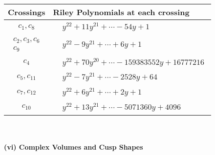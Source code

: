 \documentclass[1p]{elsarticle_modified}
\theoremstyle{definition}
\begin{document}
\begin{tabular}{m{50pt}|m{274pt}}
Crossings & \hspace{64pt}Riley Polynomials at each crossing \\
\hline $$\begin{aligned}c_{1},c_{8}\end{aligned}$$&$\begin{aligned}
&y^{22}+11 y^{21}+\cdots-54 y+1
\end{aligned}$\\
\hline $$\begin{aligned}c_{2},c_{3},c_{6}\\c_{9}\end{aligned}$$&$\begin{aligned}
&y^{22}-9 y^{21}+\cdots+6 y+1
\end{aligned}$\\
\hline $$\begin{aligned}c_{4}\end{aligned}$$&$\begin{aligned}
&y^{22}+70 y^{20}+\cdots-159383552 y+16777216
\end{aligned}$\\
\hline $$\begin{aligned}c_{5},c_{11}\end{aligned}$$&$\begin{aligned}
&y^{22}-7 y^{21}+\cdots-2528 y+64
\end{aligned}$\\
\hline $$\begin{aligned}c_{7},c_{12}\end{aligned}$$&$\begin{aligned}
&y^{22}+6 y^{21}+\cdots+2 y+1
\end{aligned}$\\
\hline $$\begin{aligned}c_{10}\end{aligned}$$&$\begin{aligned}
&y^{22}+13 y^{21}+\cdots-5071360 y+4096
\end{aligned}$\\
\hline
\end{tabular}\\~\\
\newpage\flushleft \textbf{(vi) Complex Volumes and Cusp Shapes}
\end{document}
